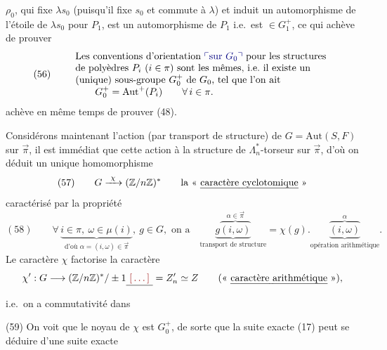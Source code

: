 \documentclass[11pt,a4paper]{article}
\begin{document}
$\rho_0$, qui fixe $\lambda s_0$ (puisqu'il fixe $s_0$ et commute à $\lambda$) et induit un automorphisme de l'étoile de $\lambda s_0$ \struck{\ill{}} pour $P_1$, est un automorphisme \add{\ill{}} de $P_1$ i.e.\ est $\in G_1^{+}$, ce qui achève de prouver
\[
(56) \qquad \begin{array}{l} \text{Les conventions d'orientation \add{sur $G_0$} pour les structures} \\ \text{de polyèdres $P_i$ ($i \in \pi$) sont les mêmes, i.e.\ il existe un} \\ \text{(unique) sous-groupe $G_0^{+}$ de $G_0$, tel que l'on ait} \\ \qquad G_0^{+} = \mathrm{Aut}^{+}(P_i) \qquad \forall\, i \in \pi . \end{array}
\]
 achève en même temps de prouver (48).

Considérons maintenant l'action (par transport de structure) de $G = \mathrm{Aut}(S, F)$ sur $\vec{\pi}$, il est immédiat que cette action  \struck{\ill{}} à la structure de $\Lambda_n^{*}$-torseur sur $\vec{\pi}$, d'où on déduit un unique homomorphisme
\[
(57) \qquad G \xrightarrow{\ \chi\ } (\mathbb{Z}/n\mathbb{Z})^{*} \qquad \text{la « \emph{caractère cyclotomique} »}
\]
caractérisé par la propriété
\[
(58) \qquad \forall\, \underbrace{i \in \pi,\ \omega \in \mu(i)}_{\text{d'où } \alpha = (i, \omega) \in \vec{\pi}},\ g \in G, \text{ on a} \quad \underbrace{g\overbrace{(i, \omega)}^{\alpha \in \vec{\pi}}}_{\text{transport de structure}} = \chi(g) . \underbrace{\overbrace{(i, \omega)}^{\alpha}}_{\text{opération arithmétique}} .
\]
Le caractère $\chi$ factorise la caractère
\[
\chi' : G \longrightarrow (\mathbb{Z}/n\mathbb{Z})^{*}/\pm 1 \struck{\ \ill{}\ } = Z'_n \simeq Z \qquad (\text{« \emph{caractère arithmétique} »}),
\]
i.e.\ on a commutativité dans


(59) On voit que le noyau de $\chi$ est $G_0^{+}$, de sorte que la suite exacte (17) peut se déduire d'une suite exacte

\end{document}
